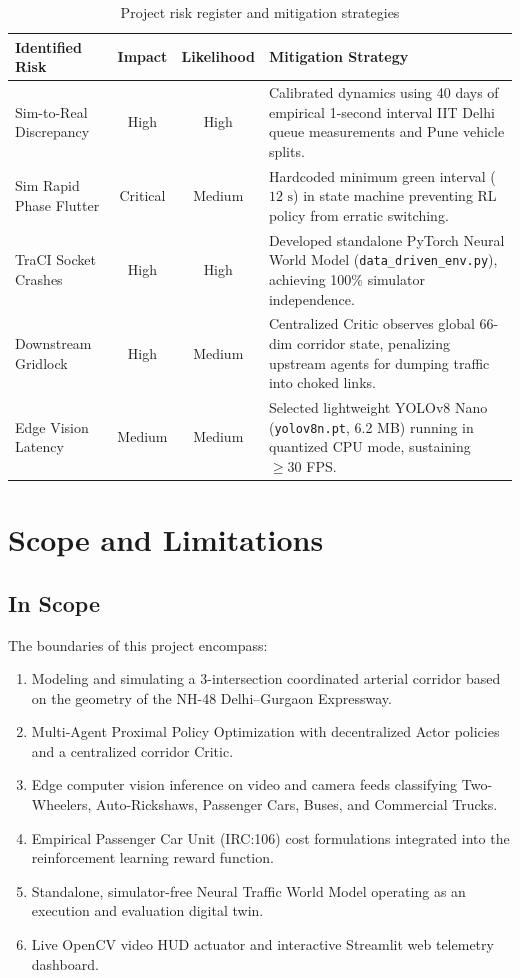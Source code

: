 \begin{table}[htbp]
\centering
\small
\caption{Project risk register and mitigation strategies}
\label{tab:risk_register}
\begin{tabularx}{\textwidth}{|p{3.2cm}|c|c|X|}
\hline
\textbf{Identified Risk} & \textbf{Impact} & \textbf{Likelihood} & \textbf{Mitigation Strategy} \\ \hline
Sim-to-Real Discrepancy & High & High & Calibrated dynamics using 40 days of empirical 1-second interval IIT Delhi queue measurements and Pune vehicle splits. \\ \hline
Sim Rapid Phase Flutter & Critical & Medium & Hardcoded minimum green interval ($12\text{ s}$) in state machine preventing RL policy from erratic switching. \\ \hline
TraCI Socket Crashes & High & High & Developed standalone PyTorch Neural World Model (\texttt{data\_driven\_env.py}), achieving 100\% simulator independence. \\ \hline
Downstream Gridlock & High & Medium & Centralized Critic observes global 66-dim corridor state, penalizing upstream agents for dumping traffic into choked links. \\ \hline
Edge Vision Latency & Medium & Medium & Selected lightweight YOLOv8 Nano (\texttt{yolov8n.pt}, 6.2 MB) running in quantized CPU mode, sustaining $\ge 30$ FPS. \\ \hline
\end{tabularx}
\end{table}

\section{Scope and Limitations}
\label{sec:scope_limitations}

\subsection{In Scope}
The boundaries of this project encompass:
\begin{enumerate}
    \item Modeling and simulating a 3-intersection coordinated arterial corridor based on the geometry of the NH-48 Delhi--Gurgaon Expressway.
    \item Multi-Agent Proximal Policy Optimization with decentralized Actor policies and a centralized corridor Critic.
    \item Edge computer vision inference on video and camera feeds classifying Two-Wheelers, Auto-Rickshaws, Passenger Cars, Buses, and Commercial Trucks.
    \item Empirical Passenger Car Unit (IRC:106) cost formulations integrated into the reinforcement learning reward function.
    \item Standalone, simulator-free Neural Traffic World Model operating as an execution and evaluation digital twin.
    \item Live OpenCV video HUD actuator and interactive Streamlit web telemetry dashboard.
\end{enumerate}

